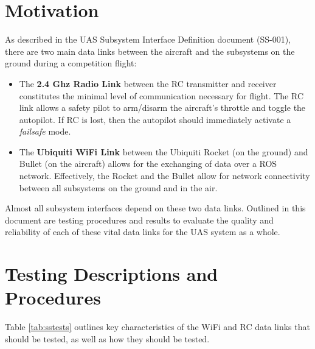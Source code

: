 \documentclass[]{auvsi_doc}
\begin{document}
\begin{AUVSITitlePage}
\begin{artifacttable}
\end{artifacttable}
\end{AUVSITitlePage}

\section{Motivation}

As described in the UAS Subsystem Interface Definition document (SS-001), there are two main data links between the aircraft and the subsystems on the ground during a competition flight:

\begin{itemize}
	\item The \textbf{2.4 Ghz Radio Link} between the RC transmitter and receiver constitutes the minimal level of communication necessary for flight. The RC link allows a safety pilot to arm/disarm the aircraft's throttle and toggle the autopilot. If RC is lost, then the autopilot should immediately activate a \textit{failsafe} mode.
	\item The \textbf{Ubiquiti WiFi Link} between the Ubiquiti Rocket (on the ground) and Bullet (on the aircraft) allows for the exchanging of data over a ROS network. Effectively, the Rocket and the Bullet allow for network connectivity between all subsystems on the ground and in the air.
\end{itemize}

Almost all subsystem interfaces depend on these two data links. Outlined in this document are testing procedures and results to evaluate the quality and reliability of each of these vital data links for the UAS system as a whole.

\section{Testing Descriptions and Procedures}

Table \ref{tab:sstests} outlines key characteristics of the WiFi and RC data links that should be tested, as well as how they should be tested.
\end{document}
